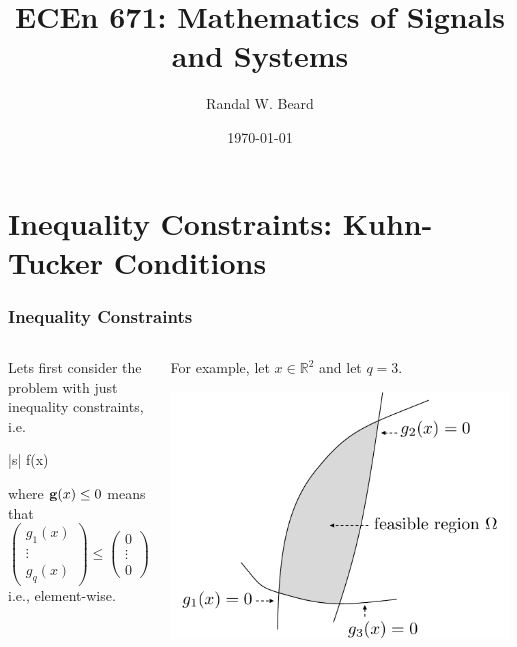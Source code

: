 \documentclass{beamer}
\title{ECEn 671: Mathematics of Signals and Systems}
\author{Randal W. Beard}
\institute{Brigham Young University}
\date{\today}
\begin{document}
\begin{frame}
	\titlepage
\end{frame}

\section{Inequality Constraints: Kuhn-Tucker Conditions}
\frame{\sectionpage}

\begin{frame}\frametitle{Inequality Constraints}
	\begin{columns}
		\begin{column}{0.5\textwidth}
			Lets first consider the problem with just inequality constraints, i.e.
			\begin{mini*}|s|
				{}{f(x)}{}{}
			\end{mini*}
			where $\mathbf{g}(x) \leq 0$ means that
			\[
				\begin{pmatrix}
			    	g_1(x)\\
			    	\vdots\\
			    	g_q(x)
			  	\end{pmatrix} 
			  	\leq \begin{pmatrix} 
		 				0 \\ \vdots \\ 0
					 \end{pmatrix}
			\]
			i.e., element-wise.			
		\end{column}
		\begin{column}{0.5\textwidth}
			For example, let $x \in \mathbb{R}^2$ and let $q = 3$.
			\begin{center}
				\includegraphics[width=0.99\textwidth]
					{figures/chap18_feasible_region}
			\end{center}			
		\end{column}
	\end{columns}
\end{frame}
\end{document}
